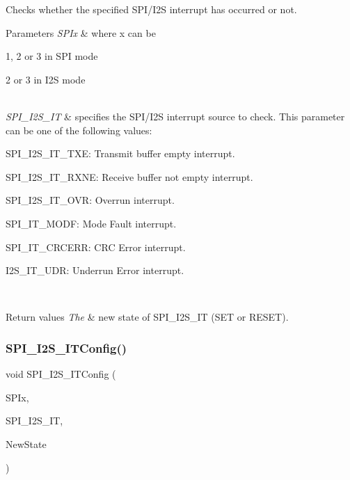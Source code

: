 Checks whether the specified S\+P\+I/\+I2S interrupt has occurred or not. 


\begin{DoxyParams}{Parameters}
{\em S\+P\+Ix} & where x can be
\begin{DoxyItemize}
\item 1, 2 or 3 in S\+PI mode
\item 2 or 3 in I2S mode 
\end{DoxyItemize}\\
\hline
{\em S\+P\+I\+\_\+\+I2\+S\+\_\+\+IT} & specifies the S\+P\+I/\+I2S interrupt source to check. This parameter can be one of the following values\+: \begin{DoxyItemize}
\item S\+P\+I\+\_\+\+I2\+S\+\_\+\+I\+T\+\_\+\+T\+XE\+: Transmit buffer empty interrupt. \item S\+P\+I\+\_\+\+I2\+S\+\_\+\+I\+T\+\_\+\+R\+X\+NE\+: Receive buffer not empty interrupt. \item S\+P\+I\+\_\+\+I2\+S\+\_\+\+I\+T\+\_\+\+O\+VR\+: Overrun interrupt. \item S\+P\+I\+\_\+\+I\+T\+\_\+\+M\+O\+DF\+: Mode Fault interrupt. \item S\+P\+I\+\_\+\+I\+T\+\_\+\+C\+R\+C\+E\+RR\+: C\+RC Error interrupt. \item I2\+S\+\_\+\+I\+T\+\_\+\+U\+DR\+: Underrun Error interrupt. \end{DoxyItemize}
\\
\hline
\end{DoxyParams}

\begin{DoxyRetVals}{Return values}
{\em The} & new state of S\+P\+I\+\_\+\+I2\+S\+\_\+\+IT (S\+ET or R\+E\+S\+ET). \\
\hline
\end{DoxyRetVals}
\mbox{\label{group___s_p_i___private___functions_ga17f4ef132e8ddbf94cb6b1688d181e41}} 
\subsubsection{\texorpdfstring{SPI\_I2S\_ITConfig()}{SPI\_I2S\_ITConfig()}}
{\footnotesize\ttfamily void S\+P\+I\+\_\+\+I2\+S\+\_\+\+I\+T\+Config (\begin{DoxyParamCaption}\item[{\mbox{\hyperlink{struct_s_p_i___type_def}{S\+P\+I\+\_\+\+Type\+Def}} $\ast$}]{S\+P\+Ix,  }\item[{uint8\+\_\+t}]{S\+P\+I\+\_\+\+I2\+S\+\_\+\+IT,  }\item[{\mbox{\hyperlink{group___exported__types_gac9a7e9a35d2513ec15c3b537aaa4fba1}{Functional\+State}}}]{New\+State }\end{DoxyParamCaption})}



